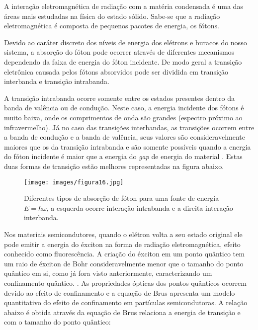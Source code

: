 \par A interação eletromagnética de radiação com a matéria condensada é uma das áreas mais estudadas na física do estado sólido. Sabe-se que a radiação eletromagnética é composta de pequenos pacotes de energia, os fótons\cite{bulk2}. 

\par Devido ao caráter discreto dos níveis de energia dos elétrons e buracos do nosso sistema, a absorção do fóton pode ocorrer através de diferentes mecanismos dependendo da faixa de energia do fóton incidente. De modo geral a transição eletrônica causada pelos fótons absorvidos pode ser dividida em transição interbanda e transição intrabanda\cite{bulk2}.

A transição intrabanda ocorre somente entre os estados presentes dentro da banda de valência ou de condução. Neste caso, a energia incidente dos fótons é muito baixa, onde os comprimentos de onda são grandes (espectro próximo ao infravermelho). Já no caso das transições interbandas, as transições ocorrem entre a banda de condução e a banda de valência, seus valores são consideravelmente maiores que os da transição intrabanda e são somente possíveis quando a energia do fóton incidente é maior que a energia do \textit{gap} de energia do material \cite{bulk2}. Estas duas formas de transição estão melhores representadas na figura abaixo. 

\begin{figure}[H]
  \centering
  \caption{Diferentes tipos de absorção de fóton para uma fonte de energia $E=\hbar \omega$, a esquerda ocorre interação intrabanda e a direita interação interbanda\cite{bulk2}.}
  \texttt{[image: images/figura16.jpg]}
  \label{fig16}
\end{figure}


Nos materiais semicondutores, quando o elétron volta a seu estado original ele pode emitir a energia do éxciton na forma de radiação eletromagnética, efeito conhecido como fluorescência. A criação do éxciton em um ponto quântico tem um raio de éxciton de Bohr consideravelmente menor que o tamanho do ponto quântico em si, como já fora visto anteriormente, caracterizando um confinamento quântico. \cite{optica1}\cite{bulk2}. As propriedades ópticas dos pontos quânticos ocorrem devido ao efeito de confinamento e a equação de Brus apresenta um modelo quantitativo do efeito de confinamento em partículas semicondutoras. A relação abaixo é obtida através da equação de Brus relaciona a energia de transição e com o tamanho do ponto quântico:


